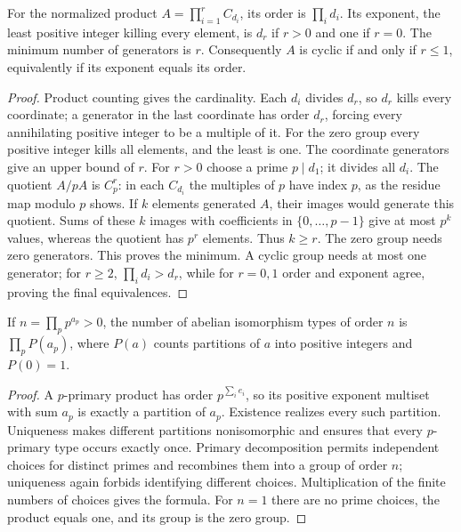 \begin{proposition}\label{prop:abelian-basic-invariants}
For the normalized product $A=\prod_{i=1}^rC_{d_i}$, its order is $\prod_i d_i$. Its exponent, the least positive integer killing every element, is $d_r$ if $r>0$ and one if $r=0$. The minimum number of generators is $r$. Consequently $A$ is cyclic if and only if $r\leq1$, equivalently if its exponent equals its order.
\end{proposition}
\begin{proof}
Product counting gives the cardinality. Each $d_i$ divides $d_r$, so $d_r$ kills every coordinate; a generator in the last coordinate has order $d_r$, forcing every annihilating positive integer to be a multiple of it. For the zero group every positive integer kills all elements, and the least is one. The coordinate generators give an upper bound of $r$. For $r>0$ choose a prime $p\mid d_1$; it divides all $d_i$. The quotient $A/pA$ is $C_p^r$: in each $C_{d_i}$ the multiples of $p$ have index $p$, as the residue map modulo $p$ shows. If $k$ elements generated $A$, their images would generate this quotient. Sums of these $k$ images with coefficients in $\{0,\ldots,p-1\}$ give at most $p^k$ values, whereas the quotient has $p^r$ elements. Thus $k\geq r$. The zero group needs zero generators. This proves the minimum. A cyclic group needs at most one generator; for $r\geq2$, $\prod_i d_i>d_r$, while for $r=0,1$ order and exponent agree, proving the final equivalences.
\end{proof}

\begin{theorem}\label{thm:abelian-partition-count}
If $n=\prod_p p^{a_p}>0$, the number of abelian isomorphism types of order $n$ is $\prod_p P(a_p)$, where $P(a)$ counts partitions of $a$ into positive integers and $P(0)=1$.
\end{theorem}
\begin{proof}
A $p$-primary product has order $p^{\sum_i e_i}$, so its positive exponent multiset with sum $a_p$ is exactly a partition of $a_p$. Existence realizes every such partition. Uniqueness makes different partitions nonisomorphic and ensures that every $p$-primary type occurs exactly once. Primary decomposition permits independent choices for distinct primes and recombines them into a group of order $n$; uniqueness again forbids identifying different choices. Multiplication of the finite numbers of choices gives the formula. For $n=1$ there are no prime choices, the product equals one, and its group is the zero group.
\end{proof}

